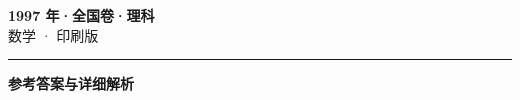 \documentclass[zihao=5, a4paper]{ctexart}
\begin{document}
\begin{center}
  {\Large\bfseries 1997 年·全国卷·理科}\\[4pt]
  {\large 数学 · 印刷版}
\end{center}
\medskip
{}

\par\bigskip\hrule\bigskip
{}
\begin{center}{\large\bfseries 参考答案与详细解析}\end{center}
\smallskip

\end{document}

